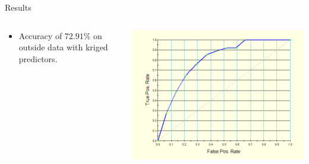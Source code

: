 \documentclass[10pt]{beamer}
\begin{document}
\begin{frame}{Results}
    \begin{columns}[T]
        \begin{column}{.35 \textwidth}
            \begin{itemize}
                \item Accuracy of $72.91\%$ on outside data with kriged predictors.
            \end{itemize}
        \end{column}
        
        \begin{column}{.65\textwidth}
        \begin{center}
            \includegraphics[width = \textwidth]{ROCcurveKriged.png}
        \end{center}
        \end{column}
    \end{columns}
    \end{frame}
\end{document}

